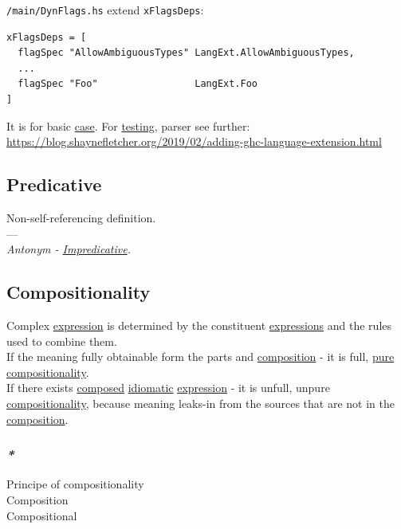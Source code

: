 \documentclass[11pt]{article}
\begin{document}
\texttt{/main/DynFlags.hs} extend \texttt{xFlagsDeps}:\\
\begin{verbatim}
xFlagsDeps = [
  flagSpec "AllowAmbiguousTypes" LangExt.AllowAmbiguousTypes,
  ...
  flagSpec "Foo"                 LangExt.Foo
]
\end{verbatim}
It is for basic \hyperref[org96bceb0]{case}. For \hyperref[orgba42eb2]{testing}, parser see further: \url{https://blog.shaynefletcher.org/2019/02/adding-ghc-language-extension.html}\\

\subsection{\label{org488427a}Predicative}
\label{sec:org28ba7b7}
Non-self-referencing definition.\\

---\\

\emph{Antonym - \hyperref[orgb8e2e94]{Impredicative}.}\\

\subsection{\label{org565c544}Compositionality}
\label{sec:orge0f70ac}
Complex \hyperref[org667db83]{expression} is determined by the constituent \hyperref[org9eb2c72]{expressions} and the rules used to combine them.\\

If the meaning fully obtainable form the parts and \hyperref[org24a8abd]{composition} - it is full, \hyperref[org08c21de]{pure} \hyperref[org565c544]{compositionality}.\\

If there exists \hyperref[orgb941f76]{composed} \hyperref[org8bbf972]{idiomatic} \hyperref[org667db83]{expression} - it is unfull, unpure \hyperref[org565c544]{compositionality}, because meaning leaks-in from the sources that are not in the \hyperref[org24a8abd]{composition}.\\

\subsubsection{\emph{*}}
\label{sec:org101b6c9}

\label{org7b75912}Principe of compositionality\\
\label{org6e6173a}Composition\\
\label{orgeadc96b}Compositional\\
\end{document}
